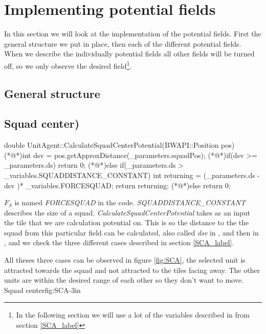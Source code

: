\section{Implementing potential fields}
	In this section we will look at the implementation of the potential fields.
	First the general structure we put in place, then each of the different potential fields. When we describe the individually potential fields all other fields will be turned off, so we only observe the desired field\footnote{In the following section we will use a lot of the variables described in from section \ref{SCA_label}}.
	
	\subsection{General structure}
	
	
	
	\subsection{Squad center)}	
		\begin{Sourcecode}[caption=Squad center]
double UnitAgent::CalculateSquadCenterPotential(BWAPI::Position pos)
{
	(*@\lnote@*)int dsv = pos.getApproxDistance(_parameters.squadPos);
	(*@\lnote@*)if(dsv >= _parameters.ds)
		return 0;	
	(*@\lnote@*)else if(_parameters.ds > _variables.SQUADDISTANCE_CONSTANT)
	{
		int returning = (_parameters.ds - dsv )* _variables.FORCESQUAD;
		return returning;
	}
	(*@\lnote@*)else
		return 0;
}
\end{Sourcecode}
		$F_{S}$ is named \textit{FORCESQUAD} in the code.
		\textit{SQUADDISTANCE\_CONSTANT} describes the size of a squad. 
		\textit{CalculateSquadCenterPotential} takes as an input the tile that we are calculation potential on. This is so the distance to the the squad from this particular field can be calculated, also called \textit{dsv} in , and then in , and  we check the three different cases described in section \ref{SCA_label}.		
		
		All theses three cases can be observed in figure \ref{fig:SCA}, the selected unit is attracted towards the squad and not attracted to the tiles facing away. The other units are within the desired range of each other so they don't want to move.
			{Squad center}{fig:SCA}{-3in}
				 
